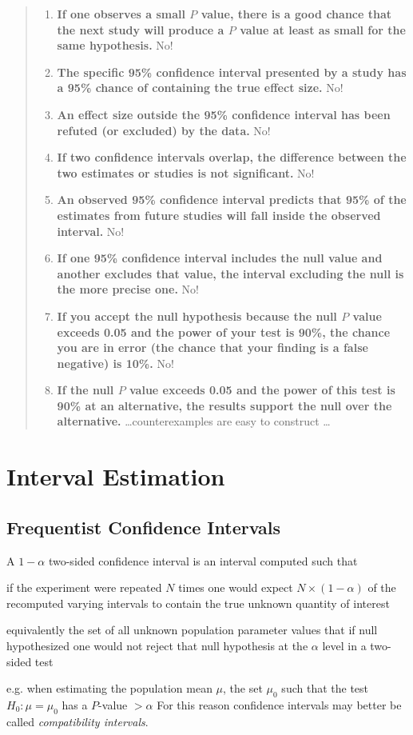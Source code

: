 \begin{quote}
\begin{enumerate}
  \item \textbf{If one observes a small $P$ value, there is a good chance that the next study will produce a $P$ value at least as small for the same hypothesis.} No!
  \item \textbf{The specific 95\% confidence interval presented by a study has a 95\% chance of containing the true effect size.} No!
  \item \textbf{An effect size outside the 95\% confidence interval has been refuted (or excluded) by the data.} No!
  \item \textbf{If two confidence intervals overlap, the difference between the two estimates or studies is not significant.} No!
  \item \textbf{An observed 95\% confidence interval predicts that 95\% of the estimates from future studies will fall inside the observed interval.} No!
  \item \textbf{If one 95\% confidence interval includes the null value and another excludes that value, the interval excluding the null is the more precise one.} No!
  \item \textbf{If you accept the null hypothesis because the null $P$ value exceeds 0.05 and the power of your test is 90\%, the chance you are in error (the chance that your finding is a false negative) is 10\%.} No!
  \item \textbf{If the null $P$ value exceeds 0.05 and the power of this test is 90\% at an alternative, the results support the null over the alternative.} \dots counterexamples are easy to construct \dots
 \end{enumerate}
\end{quote}

\section{Interval Estimation}
\subsection{Frequentist Confidence Intervals}
A $1-\alpha$ two-sided confidence interval is an interval computed such that
\bi
\item if the experiment were repeated $N$ times one would expect $N \times (1 - \alpha)$ of the recomputed varying intervals to contain the true unknown quantity of interest 
\item equivalently the set of all unknown population parameter values that if null hypothesized one would not reject that null hypothesis at the $\alpha$ level in a two-sided test
  \bi
  \item e.g. when estimating the population mean $\mu$, the set $\mu_{0}$ such that the test $H_{0}: \mu = \mu_{0}$ has a $P$-value $> \alpha$
  \ei
  For this reason confidence intervals may better be called \emph{compatibility intervals}.
\ei

